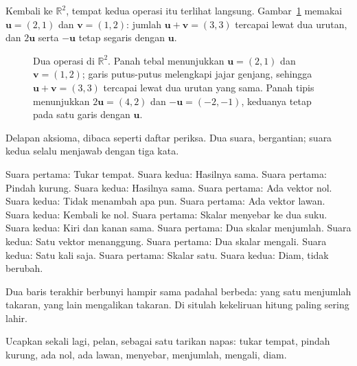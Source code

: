 Kembali ke $\mathbb{R}^{2}$, tempat kedua operasi itu terlihat langsung.
Gambar~\ref{fig:ch06-dua-operasi} memakai $\mathbf{u}=(2,1)$ dan $\mathbf{v}=(1,2)$: jumlah
$\mathbf{u}+\mathbf{v}=(3,3)$ tercapai lewat dua urutan, dan $2\mathbf{u}$ serta
$-\mathbf{u}$ tetap segaris dengan $\mathbf{u}$.

\begin{figure}[htbp]
\centering
{}
\caption{Dua operasi di $\mathbb{R}^{2}$. Panah tebal menunjukkan $\mathbf{u}=(2,1)$ dan
$\mathbf{v}=(1,2)$; garis putus-putus melengkapi jajar genjang, sehingga
$\mathbf{u}+\mathbf{v}=(3,3)$ tercapai lewat dua urutan yang sama. Panah tipis menunjukkan
$2\mathbf{u}=(4,2)$ dan $-\mathbf{u}=(-2,-1)$, keduanya tetap pada satu garis dengan
$\mathbf{u}$.}
\label{fig:ch06-dua-operasi}
\end{figure}

\begin{bacakeras}
Delapan aksioma, dibaca seperti daftar periksa. Dua suara, bergantian; suara kedua selalu
menjawab dengan tiga kata.

Suara pertama: Tukar tempat. Suara kedua: Hasilnya sama.
Suara pertama: Pindah kurung. Suara kedua: Hasilnya sama.
Suara pertama: Ada vektor nol. Suara kedua: Tidak menambah apa pun.
Suara pertama: Ada vektor lawan. Suara kedua: Kembali ke nol.
Suara pertama: Skalar menyebar ke dua suku. Suara kedua: Kiri dan kanan sama.
Suara pertama: Dua skalar menjumlah. Suara kedua: Satu vektor menanggung.
Suara pertama: Dua skalar mengali. Suara kedua: Satu kali saja.
Suara pertama: Skalar satu. Suara kedua: Diam, tidak berubah.

Dua baris terakhir berbunyi hampir sama padahal berbeda: yang satu menjumlah takaran, yang
lain mengalikan takaran. Di situlah kekeliruan hitung paling sering lahir.

Ucapkan sekali lagi, pelan, sebagai satu tarikan napas: tukar tempat, pindah kurung, ada nol,
ada lawan, menyebar, menjumlah, mengali, diam.
\end{bacakeras}


